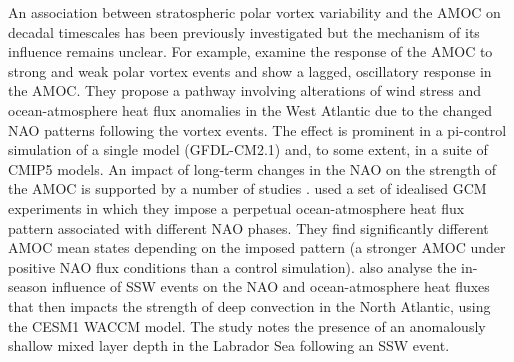 An association between stratospheric polar vortex variability and the AMOC on decadal timescales has been previously investigated \citep{schimankeMultidecadal2011b, reichlerStratospheric2012b} but the mechanism of its influence remains unclear. For example, \cite{reichlerStratospheric2012b} examine the response of the AMOC to strong and weak polar vortex events and show a lagged, oscillatory response in the AMOC. They propose a pathway involving alterations of wind stress and ocean-atmosphere heat flux anomalies in the West Atlantic due to the changed NAO patterns following the vortex events. The effect is prominent in a pi-control simulation of a single model (GFDL-CM2.1) and, to some extent, in a suite of CMIP5 models. An impact of long-term changes in the NAO on the strength of the AMOC is supported by a number of studies \citep{visbeckOcean1998b, delworthImplications2000b, delworthMultidecadal2000b, edenMechanism2001b, lohmannResponse2009, robsonCauses2012c}. \cite{delworthImpact2016c} used a set of idealised GCM experiments in which they impose a perpetual ocean-atmosphere heat flux pattern associated with different NAO phases. They find significantly different AMOC mean states depending on the imposed pattern (a stronger AMOC under positive NAO flux conditions than a control simulation). \cite{haaseImportance2018b} also analyse the in-season influence of SSW events on the NAO and ocean-atmosphere heat fluxes that then impacts the strength of deep convection in the North Atlantic, using the CESM1 WACCM model. The study notes the presence of an anomalously shallow  mixed layer depth in the Labrador Sea following an SSW event. 

